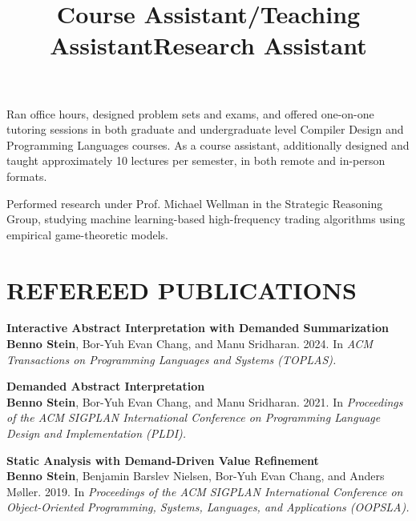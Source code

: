 \documentclass[margin,10pt]{res}
\begin{document}
\begin{resume}
\title{\textbf{Course Assistant}/\textbf{Teaching Assistant}}
\begin{position}
  Ran office hours, designed problem sets and exams, and offered one-on-one tutoring sessions in both graduate and undergraduate level Compiler Design and Programming Languages courses.
  As a course assistant, additionally designed and taught approximately 10 lectures per semester, in both remote and in-person formats.
  \end{position}

\title{\textbf{Research Assistant}}
\begin{position}
Performed research under Prof. Michael Wellman in the Strategic Reasoning Group, studying machine learning-based high-frequency trading algorithms using empirical game-theoretic models.\end{position}

\section{REFEREED PUBLICATIONS}
{\bf Interactive Abstract Interpretation with Demanded Summarization}\\
{\bf Benno Stein}, Bor-Yuh Evan Chang, and Manu Sridharan.  2024. In {\em ACM Transactions on Programming Languages and Systems (TOPLAS).}\\\vspace{-1em}

{\bf Demanded Abstract Interpretation}\\
{\bf Benno Stein}, Bor-Yuh Evan Chang, and Manu Sridharan.  2021. In {\em Proceedings of the ACM SIGPLAN International Conference on Programming Language Design and Implementation (PLDI).}\\\vspace{-1em}

{\bf Static Analysis with Demand-Driven Value Refinement}\\
{\bf Benno Stein}, Benjamin Barslev Nielsen, Bor-Yuh Evan Chang, and Anders M\o{}ller. 2019. In {\em Proceedings of the ACM SIGPLAN International Conference on Object-Oriented Programming, Systems, Languages, and Applications (OOPSLA).}\\\vspace{-1em}


\end{resume}
\end{document}
